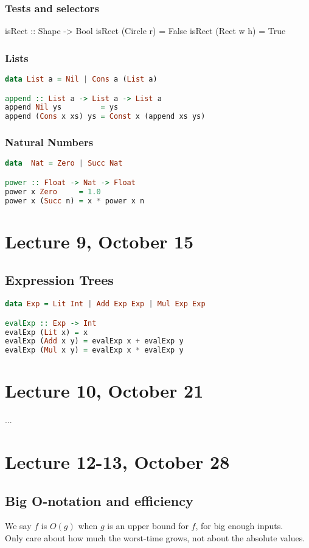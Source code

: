\documentclass{article}
\begin{document}
\subsubsection{Tests and selectors}
isRect :: Shape -> Bool
isRect (Circle r) = False
isRect (Rect w h) = True
\subsubsection{Lists}
\begin{lstlisting}[language=haskell]
data List a = Nil | Cons a (List a)

append :: List a -> List a -> List a
append Nil ys         = ys
append (Cons x xs) ys = Const x (append xs ys)
\end{lstlisting}
\subsubsection{Natural Numbers}
\begin{lstlisting}[language=haskell]
data  Nat = Zero | Succ Nat

power :: Float -> Nat -> Float
power x Zero     = 1.0
power x (Succ n) = x * power x n
\end{lstlisting}
\section{Lecture 9, October 15}
\subsection{Expression Trees}
\begin{lstlisting}[language=haskell]
data Exp = Lit Int | Add Exp Exp | Mul Exp Exp

evalExp :: Exp -> Int
evalExp (Lit x) = x
evalExp (Add x y) = evalExp x + evalExp y
evalExp (Mul x y) = evalExp x * evalExp y
\end{lstlisting}
\section{Lecture 10, October 21}
... 
\section{Lecture 12-13, October 28}
\subsection{Big O-notation and efficiency}
We say $f$ is $O(g)$ when $g$ is an upper bound for $f$, for big enough inputs.\\ 
Only care about how much the worst-time grows, not about the absolute values.
\end{document}
